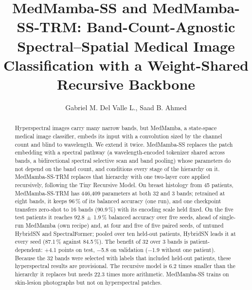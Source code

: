 \documentclass{svproc}
\newcommand{\ms}{\ensuremath{\,\pm\,}}   %
\begin{document}
\mainmatter

\title{MedMamba-SS and MedMamba-SS-TRM: Band-Count-Agnostic Spectral--Spatial Medical Image Classification with a Weight-Shared Recursive Backbone}

\author{Gabriel M. Del Valle L., Saad B. Ahmed}

\maketitle

\begin{abstract}
Hyperspectral images carry many narrow bands, but MedMamba, a state-space medical image classifier, embeds its input with a convolution sized by the channel count and blind to wavelength. We extend it twice. MedMamba-SS replaces the patch embedding with a spectral pathway (a wavelength-encoded tokenizer shared across bands, a bidirectional spectral selective scan and band pooling) whose parameters do not depend on the band count, and conditions every stage of the hierarchy on it. MedMamba-SS-TRM replaces that hierarchy with one two-layer core applied recursively, following the Tiny Recursive Model. On breast histology from 45 patients, MedMamba-SS-TRM has 446,409 parameters at both 32 and 3 bands; retrained at eight bands, it keeps 96\,\% of its balanced accuracy (one run), and one checkpoint transfers zero-shot to 16 bands (90.9\,\%) with its encoding scale held fixed. On the five test patients it reaches 92.8\ms1.9\,\% balanced accuracy over five seeds, ahead of single-run MedMamba (own recipe) and, at four and five of five paired seeds, of untuned HybridSN and SpectralFormer; pooled over ten held-out patients, HybridSN leads it at every seed (87.1\,\% against 84.5\,\%). The benefit of 32 over 3 bands is patient-dependent: +4.1 points on test, $-$5.8 on validation ($-$1.9 without one patient). Because the 32 bands were selected with labels that included held-out patients, these hyperspectral results are provisional. The recursive model is 6.2 times smaller than the hierarchy it replaces but needs 22.3 times more arithmetic. MedMamba-SS trains on skin-lesion photographs but not on hyperspectral patches.
\end{abstract}
\end{document}
